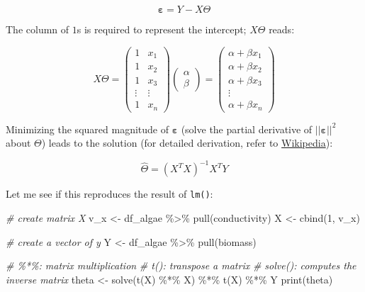\documentclass[
]{article}
\newenvironment{Shaded}{\begin{snugshade}}{\end{snugshade}}
\newcommand{\CommentTok}[1]{\textcolor[rgb]{0.56,0.35,0.01}{\textit{#1}}}
\newcommand{\DecValTok}[1]{\textcolor[rgb]{0.00,0.00,0.81}{#1}}
\newcommand{\FunctionTok}[1]{\textcolor[rgb]{0.00,0.00,0.00}{#1}}
\newcommand{\NormalTok}[1]{#1}
\newcommand{\OtherTok}[1]{\textcolor[rgb]{0.56,0.35,0.01}{#1}}
\newcommand{\SpecialCharTok}[1]{\textcolor[rgb]{0.00,0.00,0.00}{#1}}
\begin{document}
\[
\pmb{\varepsilon} = Y - X\Theta
\]

The column of \(1\)s is required to represent the intercept; \(X\Theta\) reads:

\[
X\Theta =
\begin{pmatrix} 
  1 & x_1\\ 
  1 & x_2\\
  1 & x_3\\
  \vdots & \vdots\\
  1 & x_n
\end{pmatrix}
\begin{pmatrix} 
  \alpha\\ 
  \beta
\end{pmatrix}
=
\begin{pmatrix} 
  \alpha + \beta x_1\\ 
  \alpha + \beta x_2\\
  \alpha + \beta x_3\\
  \vdots\\
  \alpha + \beta x_n
\end{pmatrix}
\]

Minimizing the squared magnitude of \(\pmb{\varepsilon}\) (solve the partial derivative of \(||\pmb{\varepsilon}||^2\) about \(\Theta\)) leads to the solution (for detailed derivation, refer to \href{https://en.wikipedia.org/wiki/Least_squares}{Wikipedia}):

\[
\hat{\Theta} = (X^TX)^{-1}X^{T}Y
\]

Let me see if this reproduces the result of \texttt{lm()}:

\begin{Shaded}
\begin{Highlighting}[]
\CommentTok{\# create matrix X}
\NormalTok{v\_x }\OtherTok{\textless{}{-}}\NormalTok{ df\_algae }\SpecialCharTok{\%\textgreater{}\%} \FunctionTok{pull}\NormalTok{(conductivity)}
\NormalTok{X }\OtherTok{\textless{}{-}} \FunctionTok{cbind}\NormalTok{(}\DecValTok{1}\NormalTok{, v\_x)}

\CommentTok{\# create a vector of y}
\NormalTok{Y }\OtherTok{\textless{}{-}}\NormalTok{ df\_algae }\SpecialCharTok{\%\textgreater{}\%} \FunctionTok{pull}\NormalTok{(biomass)}

\CommentTok{\# \%*\%: matrix multiplication}
\CommentTok{\# t(): transpose a matrix}
\CommentTok{\# solve(): computes the inverse matrix}
\NormalTok{theta }\OtherTok{\textless{}{-}} \FunctionTok{solve}\NormalTok{(}\FunctionTok{t}\NormalTok{(X) }\SpecialCharTok{\%*\%}\NormalTok{ X) }\SpecialCharTok{\%*\%} \FunctionTok{t}\NormalTok{(X) }\SpecialCharTok{\%*\%}\NormalTok{ Y}
\FunctionTok{print}\NormalTok{(theta)}
\end{Highlighting}
\end{Shaded}
\end{document}
